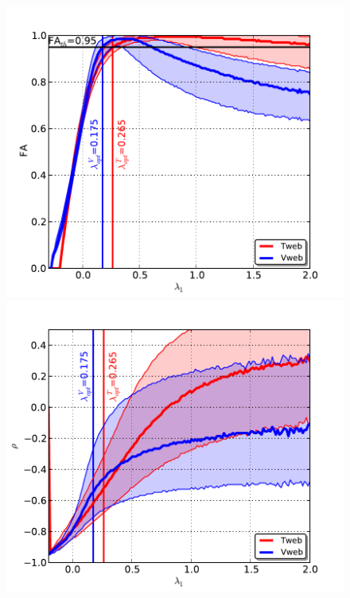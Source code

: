 \documentclass[a4,useAMS,usenatbib,usegraphicx]{latex/mn2e}
\begin{document}
\begin{flushleft}
\begin{figure}
\centering

  \includegraphics[trim = 2mm 2mm 5mm 10mm, clip, keepaspectratio=true,
  width=0.3\textheight]{./figures/FA_L1.pdf}
  \includegraphics[trim = 2mm 2mm 5mm 10mm, clip, keepaspectratio=true,
  width=0.3\textheight]{./figures/delta_L1.pdf}  
  

\end{figure}
\end{flushleft}
\end{document}
